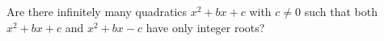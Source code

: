 Are there infinitely many quadratics $x^2+bx+c$ with $c\ne0$ such that both $x^2+bx+c$ and $x^2+bx-c$ have only integer roots?
